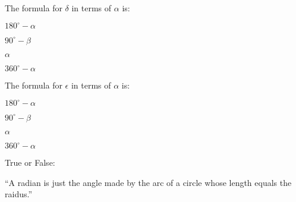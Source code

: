 \documentclass{ximera}
\begin{document}
\begin{exercise}
 The formula for $\delta$ in terms of $\alpha$ is:
 
\begin{enumerate}
\begin{multicols}{2}
 \item $180^\circ-\alpha$
 \item $90^\circ-\beta$
 \item $\alpha$
 \item $360^\circ-\alpha$
\end{multicols}
\end{enumerate}
\end{exercise}

\begin{exercise}
 The formula for $\epsilon$ in terms of $\alpha$ is:
 
\begin{enumerate}
\begin{multicols}{2}
 \item $180^\circ-\alpha$
 \item $90^\circ-\beta$
 \item $\alpha$
 \item $360^\circ-\alpha$
\end{multicols}
\end{enumerate}
\end{exercise}

\begin{exercise}
  True or False:

  ``A radian is just the angle made by the arc of a circle whose
  length equals the raidus.''
\end{exercise}

\end{document}

